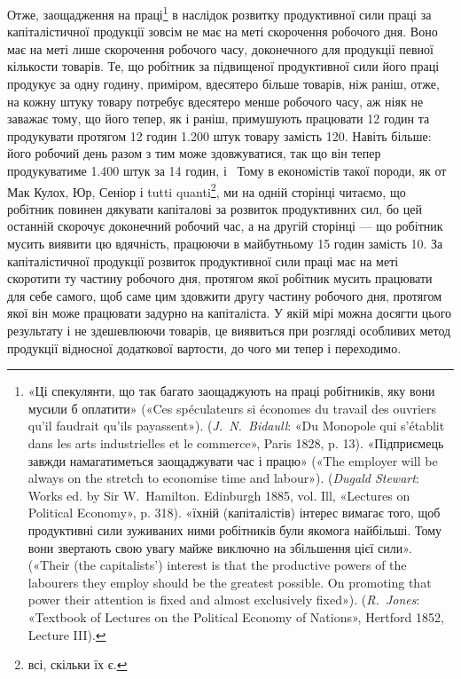 Отже, заощадження на праці\footnote{
«Ці спекулянти, що так багато заощаджують на праці робітників,
яку вони мусили б оплатити» («Ces spéculateurs si économes du travail
des ouvriers qu’il faudrait qu’ils payassent»). (\emph{J.~N.~Bidaull}: «Du
Monopole qui s’établit dans les arts industrielles et le commerce», Paris
1828, p. 13). «Підприємець завжди намагатиметься заощаджувати час і
працю» («The employer will be always on the stretch to economise
time and labour»). (\emph{Dugald Stewart}: Works ed. by Sir W.~Hamilton.
Edinburgh 1885, vol. Ill, «Lectures on Political Economy», p. 318). «їхній
(капіталістів) інтерес вимагає того, щоб продуктивні сили зуживаних
ними робітників були якомога найбільші. Тому вони звертають свою
увагу майже виключно на збільшення цієї сили». («Their (the capitalists’)
interest is that the productive powers of the labourers they employ should
be the greatest possible. On promoting that power their attention is fixed
and almost exclusively fixed»). (\emph{R.~Jones}: «Textbook of Lectures on
the Political Economy of Nations», Hertford 1852, Lecture III).
} в наслідок розвитку продуктивної сили праці за капіталістичної продукції
зовсім не має на меті скорочення робочого дня. Воно має на меті лише скорочення
робочого часу, доконечного для продукції певної кількости товарів.
Те, що робітник за підвищеної продуктивної сили його праці
продукує за одну годину, приміром, вдесятеро більше товарів,
ніж раніш, отже, на кожну штуку товару потребує вдесятеро
менше робочого часу, аж ніяк не заважає тому, що його тепер,
як і раніш, примушують працювати 12 годин та продукувати
протягом 12 годин \num{1.200} штук товару замість 120. Навіть більше:
його робочий день разом з тим може здовжуватися, так що він
тепер продукуватиме \num{1.400} штук за 14 годин, і~ Тому в економістів
такої породи, як от Мак Кулох, Юр, Сеніор і tutti
quanti\footnote*{
всі, скільки їх є. 
}, ми на одній сторінці читаємо, що робітник повинен дякувати капіталові за
розвиток продуктивних сил, бо цей останній
скорочує доконечний робочий час, а на другій сторінці — що
робітник мусить виявити цю вдячність, працюючи в майбутньому
15 годин замість 10. За капіталістичної продукції розвиток продуктивної сили
праці має на меті скоротити ту частину робочого
дня, протягом якої робітник мусить працювати для себе самого,
щоб саме цим здовжити другу частину робочого дня, протягом
якої він може працювати задурно на капіталіста. У якій мірі
можна досягти цього результату і не здешевлюючи товарів, це
виявиться при розгляді особливих метод продукції відносної
додаткової вартости, до чого ми тепер і переходимо.
